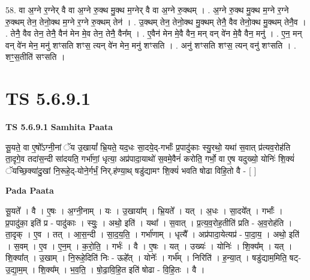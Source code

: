 \documentclass[17pt]{extarticle}
\begin{document}
58. वा अ॒ग्ने र॒ग्नेर् वै वा अ॒ग्ने रु॒क्थ मु॒क्थ म॒ग्नेर् वै वा अ॒ग्ने रु॒क्थम् । . अ॒ग्ने रु॒क्थ मु॒क्थ म॒ग्ने र॒ग्ने रु॒क्थम् तेन॒ तेनो॒क्थ म॒ग्ने र॒ग्ने रु॒क्थम् तेन॑ । . उ॒क्थम् तेन॒ तेनो॒क्थ मु॒क्थम् तेनै॒ वैव तेनो॒क्थ मु॒क्थम् तेनै॒व । . तेनै॒ वैव तेन॒ तेनै॒ वैन॑ मेन मे॒व तेन॒ तेनै॒ वैन᳚म् । . ए॒वैन॑ मेन मे॒वै वैन॒ मन् वन् वे॑न मे॒वै वैन॒ मनु॑ । . ए॒न॒ मन् वन् वे॑न मेन॒ मनु॑ शꣳसति शꣳस॒ त्यन् वे॑न मेन॒ मनु॑ शꣳसति । . अनु॑ शꣳसति शꣳस॒ त्यन् वनु॑ शꣳसति । . शꣳ॒॒स॒तीति॑ सꣳसति । \newline
\pagebreak
{}

\section{ TS 5.6.9.1 }

\textbf{TS 5.6.9.1 } \newline
\textbf{Samhita Paata} \newline

सू॒यते॒ वा ए॒षो᳚ऽग्नी॒नां ॅय उ॒खायां᳚ भ्रि॒यते॒ यद॒धः सा॒दये॒द्-गर्भाः᳚ प्र॒पादु॑काः स्यु॒रथो॒ यथा॑ स॒वात् प्र॑त्यव॒रोह॑ति ता॒दृगे॒व तदा॑स॒न्दी सा॑दयति॒ गर्भा॑णां॒ धृत्या॒ अप्र॑पादा॒याथो॑ स॒वमे॒वैनं॑ करोति॒ गर्भो॒ वा ए॒ष यदुख्यो॒ योनिः॑ शि॒क्यं॑ ॅयच्छि॒क्या॑दु॒खां नि॒रूहे॒द्-योने॒र्गर्भं॒ निर्.ह॑ण्या॒थ् षडु॑द्यामꣳ शि॒क्यं॑ भवति षोढा विहि॒तो वै - [  ] \newline

\textbf{Pada Paata} \newline

सू॒यते᳚ । वै । ए॒षः । अ॒ग्नी॒नाम् । यः । उ॒खाया᳚म् । भ्रि॒यते᳚ । यत् । अ॒धः । सा॒दये᳚त् । गर्भाः᳚ । प्र॒पादु॑का॒ इति॑ प्र - पादु॑काः । स्युः॒ । अथो॒ इति॑ । यथा᳚ । स॒वात् । प्र॒त्य॒व॒रोह॒तीति॑ प्रति - अ॒व॒रोह॑ति । ता॒दृक् । ए॒व । तत् । आ॒स॒न्दी । सा॒द॒य॒ति॒ । गर्भा॑णाम् । धृत्यै᳚ । अप्र॑पादा॒येत्यप्र॑ - पा॒दा॒य॒ । अथो॒ इति॑ । स॒वम् । ए॒व । ए॒न॒म् । क॒रो॒ति॒ । गर्भः॑ । वै । ए॒षः । यत् । उख्यः॑ । योनिः॑ । शि॒क्य᳚म् । यत् । शि॒क्या᳚त् । उ॒खाम् । नि॒रूहे॒दिति॑ निः - ऊहे᳚त् । योनेः᳚ । गर्भ᳚म् । निरिति॑ । ह॒न्या॒त् । षडु॑द्याम॒मिति॒ षट्-उ॒द्या॒म॒म् । शि॒क्य᳚म् । भ॒व॒ति॒ । षो॒ढा॒वि॒हि॒त इति॑ षोढा - वि॒हि॒तः । वै ।  \newline
\end{document}
